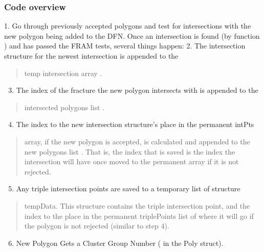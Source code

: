 \documentclass[letterpaper,10pt,english]{sphinxmanual}
\begin{document}
\subsubsection{Code overview}
\label{dfngen:code-overview}
1.      Go through previously accepted polygons and test
for intersections with the new polygon being added to the DFN.  Once an
intersection is found (by function ) and has passed
the FRAM tests, several things happen:
2.      The intersection structure for the newest intersection is appended to the
\begin{quote}

temp intersection array .
\end{quote}
\begin{enumerate}
\setcounter{enumi}{2}
\item {} 
The index of the fracture the new polygon intersects with is appended to the

\end{enumerate}
\begin{quote}

intersected polygons list .
\end{quote}
\begin{enumerate}
\setcounter{enumi}{3}
\item {} 
The index to the new intersection structure’s place in the permanent intPts

\end{enumerate}
\begin{quote}

array, if the new polygon is accepted, is calculated and appended to the new
polygons list . That is, the index that is saved is the
index the intersection will have once moved to the permanent array if it is
not rejected.
\end{quote}
\begin{enumerate}
\setcounter{enumi}{4}
\item {} 
Any triple intersection points are saved to a temporary list of structure

\end{enumerate}
\begin{quote}

tempData. This structure contains the triple intersection point, and the
index to the place in the permanent triplePoints list of where it will go if
the polygon is not rejected (similar to step 4).
\end{quote}
\begin{enumerate}
\setcounter{enumi}{5}
\item {} 
New Polygon Gets a Cluster Group Number ( in the Poly struct).

\end{enumerate}
\end{document}
